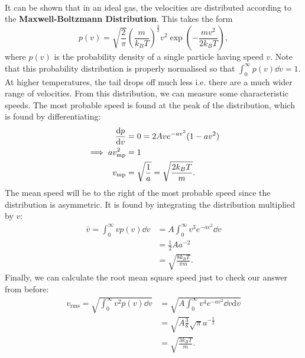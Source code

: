 \documentclass[../thermodynamics.tex]{subfiles}
\begin{document}
        \paragraph{}
        It can be shown that in an ideal gas, the velocities are distributed according to the \textbf{Maxwell-Boltzmann Distribution}.
        This takes the form
        \begin{equation}
            p(v)=\sqrt{\frac{2}{\pi}}\left(\frac{m}{k_BT}\right)^\frac{3}{2}v^2\exp\left(-\frac{mv^2}{2k_BT}\right),
        \end{equation}
        where $p(v)$ is the probability density of a single particle having speed $v$.
        Note that this probability distribution is properly normalised so that $\int_{0}^{\infty}p(v)\dd{v}=1$.
        At higher temperatures, the tail drops off much less i.e. there are a much wider range of velocities.
        From this distribution, we can measure some characteristic speeds.
        The most probable speed is found at the peak of the distribution, which is found by differentiating:
        \begin{align}
            \dv{p}{v}&=0=2Ave^{-av^2}(1-av^2)\\
            \implies av_\text{mp}^2&=1\\
            v_\text{mp}&=\sqrt{\frac{1}{a}}=\sqrt{\frac{2k_BT}{m}}.
        \end{align}
        The mean speed will be to the right of the most probable speed since the distribution is asymmetric.
        It is found by integrating the distribution multiplied by $v$:
        \begin{align}
            \bar{v}=\int_{0}^{\infty}vp(v)\dd{v}&=A\int_{0}^{\infty}v^3e^{-av^2}\dd{v}\\
            &=\frac{1}{2}Aa^{-2}\\
            &=\sqrt{\frac{8k_BT}{\pi m}}.
        \end{align}
        Finally, we can calculate the root mean square speed just to check our answer from before:
        \begin{align}
            v_\text{rms}=\sqrt{\int_{0}^{\infty}v^2p(v)\dd{v}}&=\sqrt{A\int_{0}^{\infty}v^4e^{-av^2}\dd{v}\mathrm{d}v}\\
            &=\sqrt{A\frac{3}{8}}\sqrt{\pi}a^{-\frac{5}{2}}\\
            &=\sqrt{\frac{3k_BT}{m}}.
        \end{align}
\end{document}

